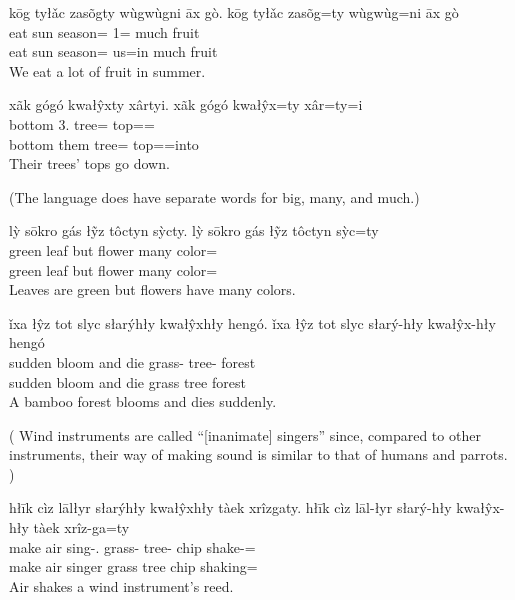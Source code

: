 \documentclass[12pt]{article}
\begin{document}
    \begin{exe}
        \ex
        kōg tyłǎc zasõgty wùgwùgni āx gò.
        \glll
        kōg tyłǎc zasõg=ty wùgwùg=ni āx gò \\
        eat sun season=\Poss{} 1\Pl{}=\InessTwo{} much fruit \\
        eat sun season=\Poss{} us=in much fruit \\
        \glt
        We eat a lot of fruit in summer.
    \end{exe}

    \begin{exe}
        \ex
        xãk gógó kwałŷxty xârtyi.
        \glll
        xãk gógó kwałŷx=ty xâr=ty=i \\
        bottom 3\Pl{}.\Anim{} tree=\Poss{} top=\Poss{}=\IllThree{} \\
        bottom them tree=\Poss{} top=\Poss{}=into \\
        \glt
        Their trees' tops go down.
    \end{exe}

    (The language does have separate words for big, many, and much.)
    \begin{exe}
        \ex
        lỳ sōkro gás łỹz tôctyn sỳcty.
        \glll
        lỳ sōkro gás łỹz tôctyn sỳc=ty \\
        green leaf but flower many color=\Poss{} \\
        green leaf but flower many color=\Poss{} \\
        \glt
        Leaves are green but flowers have many colors.
    \end{exe}

    \begin{exe}
        \ex
        ǐxa łŷz tot slyc słarýhły kwałŷxhły hengó.
        \glll
        ǐxa łŷz tot slyc słarý-hły kwałŷx-hły hengó \\
        sudden bloom and die grass-\Adj{} tree-\Adj{} forest \\
        sudden bloom and die grass tree forest \\
        \glt
        A bamboo forest blooms and dies suddenly.
    \end{exe}

    (
    Wind instruments are called ``[inanimate] singers''
    since, compared to other instruments,
    their way of making sound is similar to that of humans and parrots.
    )
    \begin{exe}
        \ex
        hłīk cìz lālłyr słarýhły kwałŷxhły tàek xrîzgaty.
        \glll
        hłīk cìz lāl-łyr słarý-hły kwałŷx-hły tàek xrîz-ga=ty \\
        make air sing-\Agt{}.\Inanim{} grass-\Adj{} tree-\Adj{} chip shake-\Ger{}=\Poss{} \\
        make air singer grass tree chip shaking=\Poss{} \\
        \glt
        Air shakes a wind instrument's reed.
    \end{exe}
\end{document}
